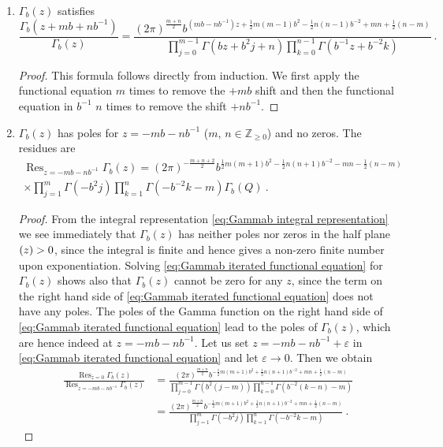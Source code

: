 \documentclass[12pt,a4paper]{article}
\newcommand{\be}{\begin{equation}}
\newcommand{\ee}{\end{equation}}
\newcommand\ZZ{\mathbb{Z}}
\let\Re\relax
\DeclareMathOperator\Re{Re}
\DeclareMathOperator*{\Res}{Res}
\begin{document}
\begin{enumerate}
    \item $\Gamma_b(z)$ satisfies
        \be  
            \frac{\Gamma_b(z+m b+n b^{-1})}{\Gamma_b(z)}=\frac{(2\pi)^{\frac{m+n}{2}}b^{(mb-n b^{-1})z+\frac{1}{2}m(m-1)b^2-\frac{1}{2}n(n-1) b^{-2}+m n+\frac{1}{2}(n-m)}}{\prod_{j=0}^{m-1} \Gamma(bz+b^2j+n)\prod_{k=0}^{n-1}\Gamma(b^{-1} z+b^{-2}k)}\ . \label{eq:Gammab iterated functional equation}
        \ee
        \begin{proof}
            This formula follows directly from induction. We first apply the functional equation $m$ times to remove the $+m b$ shift and then the functional equation in $b^{-1}$ $n$ times to remove the shift $+n b^{-1}$.
        \end{proof}
    \item $\Gamma_b(z)$ has poles for $z=-m b-n b^{-1}$ ($m,\,n \in \ZZ_{\ge 0}$) and no zeros. The residues are
    \begin{multline}  
        \Res_{z=-m b-n b^{-1}} \Gamma_b(z)
            =(2\pi)^{-\frac{m+n+2}{2}}b^{\frac{1}{2}m(m+1)b^2-\frac{1}{2}n(n+1) b^{-2}-m n-\frac{1}{2}(n-m)}\\
            \times \prod_{j=1}^{m} \Gamma(-b^2j)\prod_{k=1}^{n}\Gamma(-b^{-2}k-m)\Gamma_b(Q)\ . \label{eq:Gammab residues}
    \end{multline}
    \begin{proof}
        From the integral representation \eqref{eq:Gammab integral representation} we see immediately that $\Gamma_b(z)$ has neither poles nor zeros in the half plane $\Re(z)>0$, since the integral is finite and hence gives a non-zero finite number upon exponentiation. Solving \eqref{eq:Gammab iterated functional equation} for $\Gamma_b(z)$ shows also that $\Gamma_b(z)$ cannot be zero for any $z$, since the term on the right hand side of \eqref{eq:Gammab iterated functional equation} does not have any poles. The poles of the Gamma function on the right hand side of \eqref{eq:Gammab iterated functional equation} lead to the poles of $\Gamma_b(z)$, which are hence indeed at $z=-m b-n b^{-1}$. Let us set $z=-m b-n b^{-1}+\varepsilon$ in \eqref{eq:Gammab iterated functional equation} and let $\varepsilon \to 0$. Then we obtain
        \begin{align} 
            \frac{\Res_{z=0} \Gamma_b(z)}{\Res_{z=-m b-n b^{-1}} \Gamma_b(z)}&=\frac{(2\pi)^{\frac{m+n}{2}}b^{-\frac{1}{2}m(m+1)b^2+\frac{1}{2}n(n+1) b^{-2}+m n+\frac{1}{2}(n-m)}}{\prod_{j=0}^{m-1} \Gamma(b^2(j-m))\prod_{k=0}^{n-1}\Gamma(b^{-2}(k-n) -m)} \\
            &=\frac{(2\pi)^{\frac{m+n}{2}}b^{-\frac{1}{2}m(m+1)b^2+\frac{1}{2}n(n+1) b^{-2}+m n+\frac{1}{2}(n-m)}}{\prod_{j=1}^{m} \Gamma(-b^2j)\prod_{k=1}^{n}\Gamma(-b^{-2}k-m)} \ . \label{eq:Gammab residue ratio}

\end{align}
\end{proof}
\end{enumerate}
\end{document}
